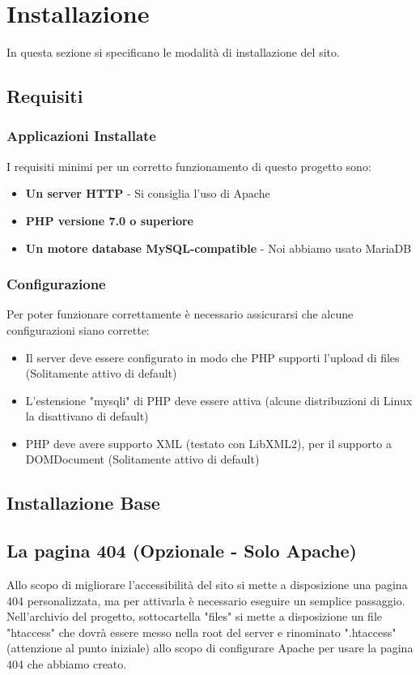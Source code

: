 \section{Installazione}
In questa sezione si specificano le modalità di installazione del sito.

\subsection{Requisiti}
\subsubsection{Applicazioni Installate}
I requisiti minimi per un corretto funzionamento di questo progetto sono:
\begin{itemize}
\item \textbf{Un server HTTP} - Si consiglia l'uso di Apache
\item \textbf{PHP versione 7.0 o superiore}
\item \textbf{Un motore database MySQL-compatible} - Noi abbiamo usato MariaDB
\end{itemize}
\subsubsection{Configurazione}
Per poter funzionare correttamente è necessario assicurarsi che alcune configurazioni siano corrette:
\begin{itemize}
\item Il server deve essere configurato in modo che PHP supporti l'upload di files (Solitamente attivo di default)
\item L'estensione "mysqli" di PHP deve essere attiva (alcune distribuzioni di Linux la disattivano di default)
\item PHP deve avere supporto XML (testato con LibXML2), per il supporto a DOMDocument (Solitamente attivo di default)
\end{itemize}

\subsection{Installazione Base}

\subsection{La pagina 404 (Opzionale - Solo Apache)}
Allo scopo di migliorare l'accessibilità del sito si mette a disposizione una pagina 404 personalizzata, ma per attivarla è necessario eseguire un semplice passaggio.\\
Nell'archivio del progetto, sottocartella "files" si mette a disposizione un file "htaccess" che dovrà essere messo nella root del server e rinominato ".htaccess" (attenzione al punto iniziale) allo scopo di configurare Apache per usare la pagina 404 che abbiamo creato.
